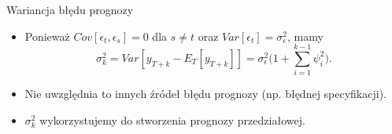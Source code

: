 \documentclass[11pt,usenames,dvipsnames,aspectratio=169]{beamer}
\begin{document}
\begin{frame}{Wariancja błędu prognozy}
\begin{itemize}
    \item Ponieważ $Cov[\epsilon_{t},\epsilon_{s}]=0$ dla $s\neq t$ oraz $Var[\epsilon_{t}]=\sigma_{\epsilon}^{2}$, mamy
    \[
    \sigma_{k}^{2}=Var[y_{T+k}-E_{T}[y_{T+k}]]=\sigma_{\epsilon}^{2}\Big(1+\sum_{i=1}^{k-1}\psi_{i}^{2}\Big).
    \]
    \item Nie uwzględnia to innych źródeł błędu prognozy (np. błędnej specyfikacji).
    \item $\sigma_{k}^{2}$ wykorzystujemy do stworzenia prognozy przedziałowej.
\end{itemize}
\end{frame}
\end{document}
